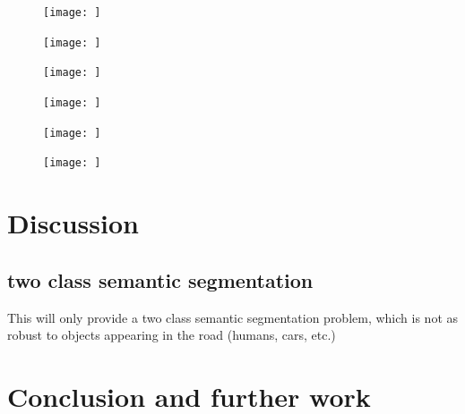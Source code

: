 \documentclass[USenglish]{ifimaster}  %
\begin{document}
\begin{figure}[!htb]
  \texttt{[image: ]}
  \caption{}\label{fig:}
\endminipage\hfill
{}
  \texttt{[image: ]}
  \caption{}\label{fig:}
\endminipage\hfill
{}%
  \texttt{[image: ]}
  \caption{}\label{fig:}
\endminipage
\end{figure}

\begin{figure}[!htb]
  \texttt{[image: ]}
  \caption{}\label{fig:}
\endminipage\hfill
{}
  \texttt{[image: ]}
  \caption{}\label{fig:}
\endminipage\hfill
{}%
  \texttt{[image: ]}
  \caption{}\label{fig:}
\endminipage
\end{figure}

\fi


\chapter{Discussion}
\section{two class semantic segmentation}
This will only provide a two class semantic segmentation problem, which is not as robust to objects appearing in the road (humans, cars, etc.) 

\chapter{Conclusion and further work}



\backmatter{}
\printbibliography
\end{document}
